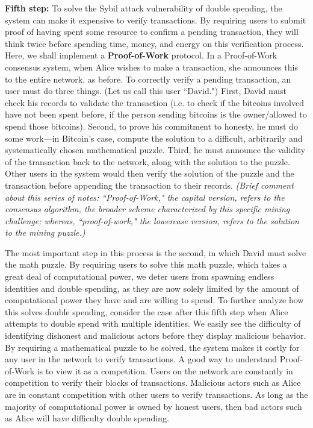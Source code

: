 \documentclass[11pt]{article}
\begin{document}
    \textbf{Fifth step:} To solve the Sybil attack vulnerability of double spending, the system can make it expensive to verify transactions. By requiring users to submit proof of having spent some resource to confirm a pending transaction, they will think twice before spending time, money, and energy on this verification process. Here, we shall implement a \textbf{Proof-of-Work} protocol. In a Proof-of-Work consensus system, when Alice wishes to make a transaction, she announces this to the entire network, as before. To correctly verify a pending transaction, an user must do three things. (Let us call this user ``David.") First, David must check his records to validate the transaction (i.e. to check if the bitcoins involved have not been spent before, if the person sending bitcoins is the owner/allowed to spend those bitcoins). Second, to prove his commitment to honesty, he must do some work---in Bitcoin's case, compute the solution to a difficult, arbitrarily and systematically chosen mathematical puzzle. Third, he must announce the validity of the transaction back to the network, along with the solution to the puzzle. Other users in the system would then verify the solution of the puzzle and the transaction before appending the transaction to their records. \textit{(Brief comment about this series of notes: ``Proof-of-Work," the capital version, refers to the consensus algorithm, the broader scheme characterized by this specific mining challenge; whereas, ``proof-of-work," the lowercase version, refers to the solution to the mining puzzle.)}
    
    The most important step in this process is the second, in which David must solve the math puzzle. By requiring users to solve this math puzzle, which takes a great deal of computational power, we deter users from spawning endless identities and double spending, as they are now solely limited by the amount of computational power they have and are willing to spend. To further analyze how this solves double spending, consider the case after this fifth step when Alice attempts to double spend with multiple identities. We easily see the difficulty of identifying dishonest and malicious actors before they display malicious behavior. By requiring a mathematical puzzle to be solved, the system makes it costly for any user in the network to verify transactions. A good way to understand Proof-of-Work is to view it as a competition. Users on the network are constantly in competition to verify their blocks of transactions. Malicious actors such as Alice are in constant competition with other users to verify transactions. As long as the majority of computational power is owned by honest users, then bad actors such as Alice will have difficulty double spending.
    
\end{document}
